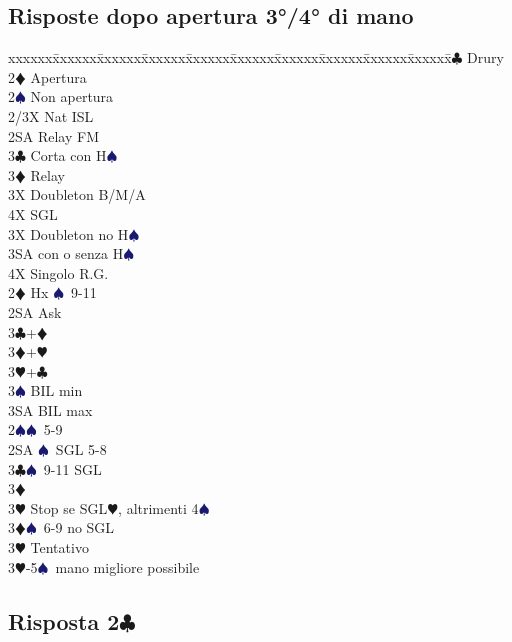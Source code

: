 \documentclass[a4paper,italian]{article}
\newcommand{\BC}{\textcolor{OliveGreen}{$\clubsuit$}}
\newcommand{\BD}{\textcolor{RedOrange}{$\vardiamondsuit$}}
\newcommand{\BH}{\textcolor{Red2}{$\varheartsuit${}}}
\newcommand{\BS}{\textcolor{MidnightBlue}{$\spadesuit${}}}
\newcommand{\pdfc}{\texorpdfstring{\BC{}}{C}}
\newenvironment{bidtable}
{\begin{tabbing}

    xxxxxx\=xxxxxx\=xxxxxx\=xxxxxx\=xxxxxx\=xxxxxx\=xxxxxx\=xxxxxx\=xxxxxx\=xxxxxx\=\kill}
{\end{tabbing} }%
\begin{document}
\begin{multicols}{2}
    \subsection{Risposte dopo apertura 3°/4° di mano}

    \begin{bidtable}
        2\BC \> Drury\+\\
        2\BD \> Apertura\\
        2\BS \> Non apertura\\
        2/3X \> Nat ISL\\
        2SA \> Relay FM\+\\
        3\BC \> Corta con H\BS \+\\
        3\BD \> Relay\+\\
        3X \> Doubleton B/M/A\\
        4X \> SGL\-\-\\
        3X \> Doubleton no H\BS \\
        3SA  con o senza H\BS \\
        4X \> Singolo R.G.\-\-\\
        2\BD \> Hx \BS\ 9-11\+\\
        2SA \> Ask \+\\
        3\BC {}+\BD\\
        3\BD {}+\BH\\
        3\BH {}+\BC\\
        3\BS \> BIL min\\
        3SA \> BIL max\-\-\\
        2\BS {}\BS\ 5-9\\
        2SA \BS\ SGL 5-8\\
        3\BC {}\BS\ 9-11 SGL\+\\
        3\BD \> \textregistered\\
        3\BH \> Stop se SGL\BH, altrimenti 4\BS\-\\
        3\BD {}\BS\ 6-9 no SGL\+\\
        3\BH \> Tentativo \-\\
        3\BH {}-5\BS\, mano migliore possibile
    \end{bidtable}
\end{multicols}

\newpage

\subsection{Risposta 2\pdfc}
\end{document}
